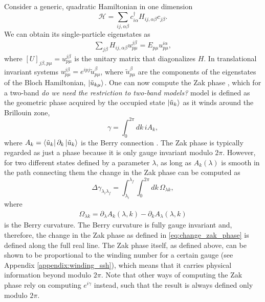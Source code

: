 \documentclass[twocolumn,amsmath,longbibliography,amssymb,superscriptaddress]{revtex4-1}
\newcommand{\mariac}[1]{{\it\color{cyan}#1}}
\begin{document}
Consider a generic, quadratic Hamiltonian in one dimension
\begin{equation}\label{eq:quadr_Ham}
\mathcal{H} = \sum_{ij,\alpha\beta} c_{i\alpha}^\dagger H_{ij,\alpha \beta}c_{j\beta}.
\end{equation}
We can obtain its single-particle eigenstates as
\begin{align}
\sum_{j\beta}H_{ij,\alpha\beta} u_{p\mu}^{j\beta} = E_{p\mu} u^{i\alpha}_{p\mu},
\end{align}
where $[U]_{j\beta,p\mu} = u_{p\mu}^{j\beta}$ is the unitary matrix that diagonalizes $H$. In translational invariant systems $u_{p\mu}^{j\beta} = e^{ipj}\tilde{u}_{p \mu}^{\beta}$, where $\tilde{u}_{p \mu}^{\beta}$ are the components of the eigenstates of the Bloch Hamiltonian, $\ket{\tilde{u}_{k\mu}}$. One can now compute the Zak phase \cite{Zak1989}, which for a two-band \mariac{do we need the restriction to two-band models?} model is defined as the geometric phase acquired by the occupied state $\ket{\tilde{u}_k}$ as it winds around the Brillouin zone,
\begin{equation}
\gamma = \int_{0}^{2\pi} dk\, i A_k, 
\label{eq:zak_phase}
\end{equation}
where $A_k = \bra{\tilde{u}_k}\partial_k \ket{\tilde{u}_k}$ is the Berry connection \cite{Berry1984}. The Zak phase is typically regarded as just a phase because it is only gauge invariant modulo $2\pi$. However, for two different states defined by a parameter $\lambda$, as long as $A_k(\lambda)$ is smooth in the path connecting them the change in the Zak phase can be computed as
\begin{equation}
\Delta {\gamma_{\lambda_i \lambda_f}} = \int_{\lambda_i}^{\lambda_f}\int_{0}^{2\pi} dk \, \Omega_{\lambda k},
\label{eq:change_zak_phase}
\end{equation}
where 
\begin{align}\label{eq:BerryCurvature}
\Omega_{\lambda k} = \partial_\lambda A_k(\lambda,k) - \partial_k A_\lambda(\lambda,k)
\end{align}
 is the Berry curvature. The Berry curvature is fully gauge invariant and, therefore, the change in the Zak phase as defined in \eqref{eq:change_zak_phase} is defined along the full real line. The Zak phase itself, as defined above, can be shown to be proportional to the winding number for a certain gauge (see Appendix \ref{appendix:winding_ssh}), which means that it carries physical information beyond modulo $2\pi$. Note that other ways of computing the Zak phase rely on computing $e^{i\gamma}$ instead, such that the result is always defined only modulo $2\pi$.
\end{document}
